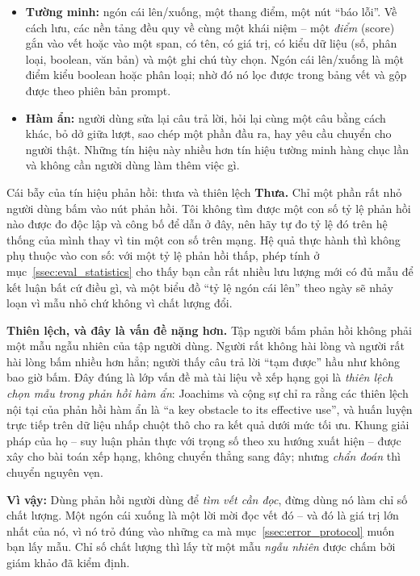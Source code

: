 \begin{itemize}
	\item \textbf{Tường minh:} ngón cái lên/xuống, một thang điểm, một nút ``báo lỗi''. Về cách lưu, các nền tảng đều quy về cùng một khái niệm -- một \emph{điểm} (score) gắn vào vết hoặc vào một span, có tên, có giá trị, có kiểu dữ liệu (số, phân loại, boolean, văn bản) và một ghi chú tùy chọn. Ngón cái lên/xuống là một điểm kiểu boolean hoặc phân loại; nhờ đó nó lọc được trong bảng vết và gộp được theo phiên bản prompt.
	\item \textbf{Hàm ẩn:} người dùng sửa lại câu trả lời, hỏi lại cùng một câu bằng cách khác, bỏ dở giữa lượt, sao chép một phần đầu ra, hay yêu cầu chuyển cho người thật. Những tín hiệu này nhiều hơn tín hiệu tường minh hàng chục lần và không cần người dùng làm thêm việc gì.
\end{itemize}

\begin{pitfall}{Cái bẫy của tín hiệu phản hồi: thưa và thiên lệch}
\textbf{Thưa.} Chỉ một phần rất nhỏ người dùng bấm vào nút phản hồi. Tôi không tìm được một con số tỷ lệ phản hồi nào được đo độc lập và công bố để dẫn ở đây, nên hãy tự đo tỷ lệ đó trên hệ thống của mình thay vì tin một con số trên mạng. Hệ quả thực hành thì không phụ thuộc vào con số: với một tỷ lệ phản hồi thấp, phép tính ở mục~\ref{ssec:eval_statistics} cho thấy bạn cần rất nhiều lưu lượng mới có đủ mẫu để kết luận bất cứ điều gì, và một biểu đồ ``tỷ lệ ngón cái lên'' theo ngày sẽ nhảy loạn vì mẫu nhỏ chứ không vì chất lượng đổi.

\textbf{Thiên lệch, và đây là vấn đề nặng hơn.} Tập người bấm phản hồi không phải một mẫu ngẫu nhiên của tập người dùng. Người rất không hài lòng và người rất hài lòng bấm nhiều hơn hẳn; người thấy câu trả lời ``tạm được'' hầu như không bao giờ bấm. Đây đúng là lớp vấn đề mà tài liệu về xếp hạng gọi là \emph{thiên lệch chọn mẫu trong phản hồi hàm ẩn}: Joachims và cộng sự \cite{joachims2016unbiased} chỉ ra rằng các thiên lệch nội tại của phản hồi hàm ẩn là ``a key obstacle to its effective use'', và huấn luyện trực tiếp trên dữ liệu nhấp chuột thô cho ra kết quả dưới mức tối ưu. Khung giải pháp của họ -- suy luận phản thực với trọng số theo xu hướng xuất hiện -- được xây cho bài toán xếp hạng, không chuyển thẳng sang đây; nhưng \emph{chẩn đoán} thì chuyển nguyên vẹn.

\textbf{Vì vậy:} Dùng phản hồi người dùng để \emph{tìm vết cần đọc}, đừng dùng nó làm chỉ số chất lượng. Một ngón cái xuống là một lời mời đọc vết đó -- và đó là giá trị lớn nhất của nó, vì nó trỏ đúng vào những ca mà mục~\ref{ssec:error_protocol} muốn bạn lấy mẫu. Chỉ số chất lượng thì lấy từ một mẫu \emph{ngẫu nhiên} được chấm bởi giám khảo đã kiểm định.
\end{pitfall}

